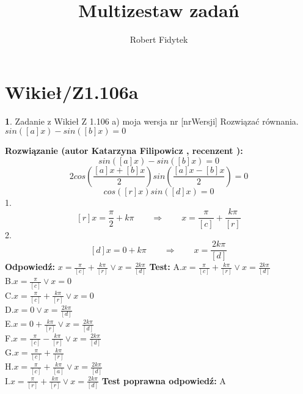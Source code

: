 \documentclass[12pt, a4paper]{article}
\title{Multizestaw zadań}
\author{Robert Fidytek}
\date{}
\theoremstyle{definition} %
\newtheorem{zad}{}
\newcommand{\kategoria}[1]{\section{#1}} %
\newcommand{\zadStart}[1]{\begin{zad}#1\newline} %
\newcommand{\zadStop}{\end{zad}}   %
\newcommand{\rozwStart}[2]{\noindent \textbf{Rozwiązanie (autor #1 , recenzent #2): }\newline} %
\newcommand{\rozwStop}{\newline}                                            %
\newcommand{\odpStart}{\noindent \textbf{Odpowiedź:}\newline}    %
\newcommand{\odpStop}{\newline}                                             %
\newcommand{\testStart}{\noindent \textbf{Test:}\newline} %
\newcommand{\testStop}{\newline} %
\newcommand{\kluczStart}{\noindent \textbf{Test poprawna odpowiedź:}\newline} %
\newcommand{\kluczStop}{\newline} %
\begin{document}
\maketitle


\kategoria{Wikieł/Z1.106a}
\zadStart{Zadanie z Wikieł Z 1.106 a) moja wersja nr [nrWersji]}
Rozwiązać równania.\\
 $sin([a]x)-sin([b]x)=0$
\zadStop
\rozwStart{Katarzyna Filipowicz}{}
$$
sin([a]x)-sin([b]x)=0
$$
$$
2cos\left(\frac{[a]x+[b]x}{2}\right)sin\left(\frac{[a]x-[b]x}{2}\right)=0
$$ $$
cos([r]x)sin([d]x)=0
$$
1.
 $$
[r]x=\frac{\pi}{2}+k\pi \qquad \Rightarrow \qquad x=\frac{\pi}{[c]}+\frac{k\pi}{[r]}
$$
2.
$$
[d]x=0+k\pi  \qquad \Rightarrow \qquad x=\frac{2k\pi}{[d]}
$$
\rozwStop
\odpStart
$x=\frac{\pi}{[c]}+\frac{k\pi}{[r]}  \vee x=\frac{2k\pi}{[d]}$
\odpStop
\testStart
A.$x=\frac{\pi}{[c]}+\frac{k\pi}{[r]}  \vee x=\frac{2k\pi}{[d]}$\\
B.$x=\frac{\pi}{[c]}  \vee x=0$\\
C.$x=\frac{\pi}{[c]}+\frac{k\pi}{[r]}  \vee x=0$\\
D.$x=0  \vee x=\frac{2k\pi}{[d]}$\\
E.$x=0+\frac{k\pi}{[r]}  \vee x=\frac{2k\pi}{[d]}$\\
F.$x=\frac{\pi}{[c]}-\frac{k\pi}{[r]}  \vee x=\frac{2k\pi}{[d]}$\\
G.$x=\frac{\pi}{[c]}+\frac{k\pi}{[r]} $\\
H.$x=\frac{\pi}{[c]}+\frac{k\pi}{[a]}  \vee x=\frac{2k\pi}{[d]}$\\
I.$x=\frac{\pi}{[r]}+\frac{k\pi}{[r]}  \vee x=\frac{2k\pi}{[d]}$
\testStop
\kluczStart
A
\kluczStop
\end{document}
